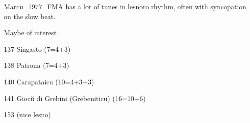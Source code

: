 
Marcu_1977_FMA has a lot of tunes in lesnoto rhythm, often with syncopation on the slow beat.

Maybe of interest
\item{137} Singasto (7=4+3)
\item{138} Patrona (7=4+3)
\item{140} Carapataicu (10=4+3+3)
\item{141} Giocŭ di Grebini (Grebeniticu) (16=10+6)
\item{153} (nice lesno)
